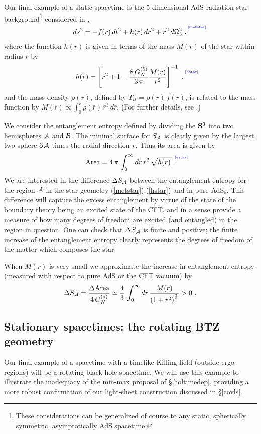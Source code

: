 \documentclass[12pt]{article}
\newcommand{\be}{\begin{equation}}
\newcommand{\ee}{\end{equation}}
\def\sec#1{\S \;\ref{#1}}
\def\req#1{(\ref{#1})}
\def\p{\partial}
\def\s{\sigma}
\def\CA{{\cal A}}
\def\CB{{\cal B}}
\def\Sp{{\bf S}}
\def\p{\partial}
\def\f#1#2{{\frac{#1}{#2}}}
\def\f#1#2{{\frac{#1}{#2}}}
\def\p{\partial}
\def\Label#1{\label{#1}%
{ \color{blue}{\smash{\hbox to0pt{\raise2ex\hbox{\tiny[#1]}\hss}}}}}
\def\rA{\CA}
\def\rB{\CB}
\def\brA{\p \CA}
\def\rb{{\bar r}}
\def\ads#1{AdS$_{#1}$}
\def\s{\sqrt}
\def\f {\frac}
\begin{document}
Our final example of a static spacetime is the
5-dimensional AdS radiation star background\footnote{These
considerations can be generalized of course to any static,
spherically symmetric, asymptotically AdS spacetime.} considered in
\cite{Hubeny:2006yu},
%
\be ds^2=-f(r)\, dt^2+h(r)\, dr^2+r^2\, d\Omega_3^2\ ,
\Label{metstar}
\ee
%
where the function $h(r)$ is given in terms of the mass $M(r)$ of
the star within radius $r$ by
%
\be h(r)=\left[r^2+1-\f{8\,
G^{(5)}_N}{3\,\pi}\f{M(r)}{r^2}\right]^{-1} \ ,
\Label{hstar}
\ee
%
and the mass density $\rho(r)$, defined by $T_{tt}=\rho(r)\,f(r)$, is related to the mass function by $M(r) \propto \int_0^r \rho(\rb) \, \rb^3 \, d \rb$.  (For further details, see \cite{Hubeny:2006yu}.)

We consider the entanglement entropy defined by dividing the $\Sp^3$
into two hemispheres $\rA$ and $\rB$. The minimal surface for
$S_{\rA}$ is clearly given by the largest two-sphere $\brA$ times
the radial direction $r$. Thus its area is given by
%
\be \mbox{Area}=4\, \pi\,
\int^\infty_0 dr \, r^2\, \s{h(r)} \ .
\Label{estar} \ee
%
 We are interested in  the difference $\Delta S_{\rA}$ between the entanglement entropy for the region $\rA$ in the star geometry \req{metstar},\req{hstar} and in pure \ads{5}.
 This difference will capture the excess entanglement by virtue of the state of the boundary theory being an excited state of the CFT, and in a sense provide a measure of how many degrees of freedom are excited (and entangled) in the region in question. One can check that $\Delta S_{\rA}$ is finite and positive; the finite increase of the entanglement entropy clearly represents the degrees of freedom of the matter which composes the star.

When $M(r)$ is very small we  approximate the increase in entanglement entropy  (measured with respect to pure AdS or the CFT vacuum) by
%
\be \Delta S_{\rA}=\f{\Delta \mbox{Area}}{4\, G^{(5)}_N}\simeq
\f{4}{3}\, \int^\infty_0 dr\,
\f{M(r)}{\left(1+ r^2\right)^{\f{3}{2}}}>0 \ . \ee
%

\subsection{Stationary spacetimes: the rotating BTZ geometry}

Our final example of a spacetime with a timelike Killing field
(outside ergo-regions) will be a rotating black hole spacetime. We
will use this example to illustrate the inadequacy of the min-max
proposal of \sec{holtimedep}, providing a more robust confirmation
of our light-sheet construction discussed in \sec{covls}.
\end{document}
